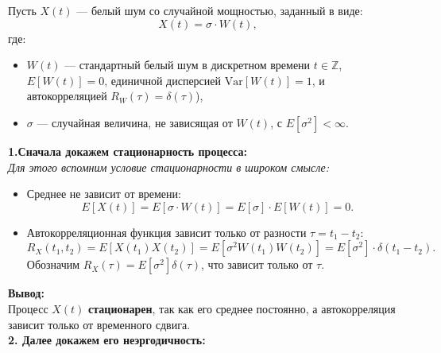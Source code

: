 {

Пусть \( X(t) \) — белый шум со случайной мощностью, заданный в виде:
\[
X(t) = \sigma \cdot W(t),
\]
где:
\begin{itemize}
\item \( W(t) \) — стандартный белый шум в дискретном времени \(t
  \in \mathbb{Z}\), \(
  E[W(t)] = 0 \), единичной дисперсией \( \text{Var}[W(t)] = 1 \),
и автокорреляцией \( R_W(\tau) = \delta(\tau) \)),
\item \( \sigma \) — случайная величина, не зависящая от \( W(t)
\), с \( E[\sigma^2] < \infty \).
\end{itemize}

\textbf{1.Сначала докажем стационарность процесса:}\\
\textit{Для этого вспомним условие стационарности в широком смысле:}

\begin{itemize}
\item Среднее не зависит от времени:
\[
  E[X(t)] = E[\sigma \cdot W(t)] = E[\sigma] \cdot E[W(t)] = 0.
\]

\item Автокорреляционная функция зависит только от разности \( \tau
= t_1 - t_2 \):
\[
  R_X(t_1, t_2) = E[X(t_1)X(t_2)] = E[\sigma^2 W(t_1) W(t_2)] =
  E[\sigma^2] \cdot \delta(t_1 - t_2).
\]
Обозначим \( R_X(\tau) = E[\sigma^2] \delta(\tau) \), что зависит
только от \( \tau \).
\end{itemize}

\textbf{Вывод:}\\
Процесс \( X(t) \) \textbf{стационарен}, так как его среднее
постоянно, а автокорреляция зависит только от временного сдвига.\\

\textbf{2. Далее докажем его неэргодичность:}\\

}
